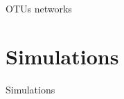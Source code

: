 \documentclass[11pt]{beamer}
\newcommand{\prune}[1]{\textcolor{Framaprunelight}{#1}}
\begin{document}
\begin{frame}{OTUs networks}
{\begin{figure}
													\label{fig-meta-graphs}
												\end{figure}
											}
										\end{frame}
										

										\section{Simulations}
										\begin{frame}{}
											\begin{center}
												\Huge{\prune{Simulations}}
											\end{center}
										\end{frame}
										
\end{document}
